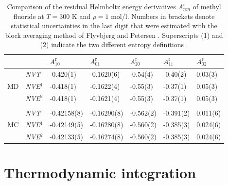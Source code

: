 \documentclass[preprint,12pt]{elsarticle}
\begin{document}
\begin{table}
  \centering
  \caption{Comparison of the residual Helmholtz energy derivatives $A^\text{r}_{nm}$ of methyl fluoride \cite{sto03} at $T=300$ K and $\rho=1$ mol/l. Numbers in brackets denote statistical uncertainties in the last digit that were estimated with the block averaging method of Flyvbjerg and Petersen \cite{fly89}. Superscripts (1) and (2) indicate the two different entropy definitions \cite{lus12}.} 
    \begin{tabular}{rrlllll}
    \hline
          &       & $A^\text{r}_{10}$ & $A^\text{r}_{01}$ & $A^\text{r}_{20}$ & $A^\text{r}_{11}$ & $A^\text{r}_{02}$\\
    \hline
    \multicolumn{1}{c}{\multirow{3}[0]{*}{MD}} & \multicolumn{1}{l}{\textit{NVT}} & -0.420(1)	&	-0.1620(6) & -0.54(4) &	-0.40(2) & 0.03(3)	\\
    \multicolumn{1}{c}{} & \multicolumn{1}{l}{\textit{NVE$^1$}} &	-0.418(1)	&	-0.1622(4)	&	-0.55(3)	&	-0.37(1)	&	0.05(3)	\\
    \multicolumn{1}{c}{} & \multicolumn{1}{l}{\textit{NVE$^2$}} &	-0.418(1)	&	-0.1621(4)	&	-0.55(3)	&	-0.37(1)	&	0.05(3)	\\
                     
          & \multicolumn{1}{l}{\textit{}} &       &       &       &   &\\
    \multicolumn{1}{c}{\multirow{3}[0]{*}{MC}} & \multicolumn{1}{l}{\textit{NVT}} &	-0.42158(8)	&	-0.16290(8)	&	-0.562(2)	&	-0.391(2)	&	0.011(6)	\\
    \multicolumn{1}{c}{} & \multicolumn{1}{l}{\textit{NVE$^1$}} &	-0.42149(5)	&	-0.16280(8)	&	-0.560(2)	&	-0.385(3)	&	0.024(6)	\\
    \multicolumn{1}{c}{} & \multicolumn{1}{l}{\textit{NVE$^2$}} &	-0.42133(5)	&	-0.16274(8)	&	-0.560(2)	&	-0.385(3)	&	0.024(6)	\\
    \hline
    \end{tabular}%
  \label{tab:lustig}%
\end{table}%

\section{Thermodynamic integration}
\label{sec:thermoint}
\end{document}
